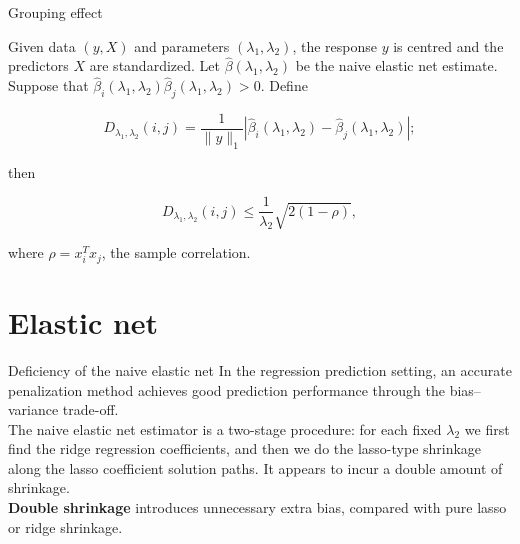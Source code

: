 \begin{frame}{Grouping effect}
    \begin{theorem}[1]
        Given data \( (y, X) \) and parameters \( (\lambda_1, \lambda_2) \), the response \( y \) is centred and the predictors \( X \) are standardized. Let \( \hat{\beta}(\lambda_1, \lambda_2) \) be the naive elastic net estimate. Suppose that \( \hat{\beta}_i(\lambda_1, \lambda_2) \hat{\beta}_j(\lambda_1, \lambda_2) > 0 \). Define

$$
D_{\lambda_1,\lambda_2}(i, j) = \frac{1}{\lVert y \rVert_1} \left| \hat{\beta}_i(\lambda_1, \lambda_2) - \hat{\beta}_j(\lambda_1, \lambda_2) \right|;
$$

then

$$
D_{\lambda_1,\lambda_2}(i, j) \leq \frac{1}{\lambda_2} \sqrt{2(1 - \rho)},
$$

where \( \rho = x_i^T x_j \), the sample correlation.
    \end{theorem}
\end{frame}

\section{Elastic net}
    \begin{frame}{Deficiency of the naive elastic net}
    In the regression prediction setting, an accurate penalization method achieves good prediction performance through the bias–variance trade-off.\\ 
    \vspace{10pt}
    The naive elastic net estimator is a two-stage procedure: for each fixed $\lambda_2$ we first find the ridge regression coefficients, and then we do the lasso-type shrinkage along the lasso coefficient solution paths. It appears to incur a double amount of shrinkage. \\
    \vspace{10pt}
    \textbf{Double shrinkage} introduces unnecessary extra bias, compared with pure lasso or ridge shrinkage. 
    \end{frame}

